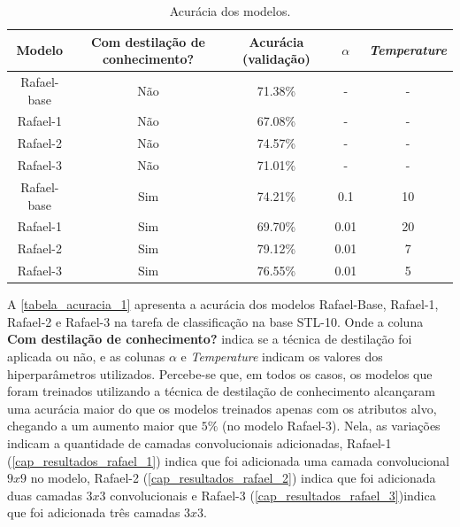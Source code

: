 \begin{center}
\begin{table}[htb]
\centering
\ABNTEXfontereduzida
\caption[Acurácia dos modelos]{Acurácia dos modelos.}
\label{tabela_acuracia_1}
\begin{tabular}{ |c|c|c|c|c| }
	\hline
	\textbf{Modelo} & \textbf{Com destilação de conhecimento?}  & \textbf{Acurácia (validação)}
		   & \textbf{$\alpha$} & \textbf{\textit{Temperature}} \\
	\hline
	Rafael-base 	& 	Não 	& 	71.38\%	& 	- 	& 	-	 \\
	Rafael-1 	& 	Não 	& 	67.08\%	& 	- 	& 	-	 \\
	Rafael-2 	& 	Não 	& 	74.57\%	& 	- 	& 	-	 \\
	Rafael-3 	& 	Não 	& 	71.01\%	& 	- 	& 	-	 \\
	Rafael-base 	& 	Sim 	& 	74.21\%	& 	0.1 	& 	10	 \\
	Rafael-1 	& 	Sim 	& 	69.70\%	& 	0.01 	& 	20	 \\
	Rafael-2 	& 	Sim 	& 	79.12\%	& 	0.01 	& 	7	 \\
	Rafael-3 	& 	Sim 	& 	76.55\%	& 	0.01 	& 	5	 \\
	\hline
\end{tabular}
\end{table}
\end{center}

A \autoref{tabela_acuracia_1} apresenta a acurácia dos modelos Rafael-Base, Rafael-1, Rafael-2 e Rafael-3 na tarefa de
classificação na base STL-10.
Onde a coluna \textbf{Com destilação de conhecimento?} indica se a técnica de destilação foi aplicada
ou não, e as colunas $\alpha$ e \textit{Temperature} indicam os valores dos hiperparâmetros utilizados.
Percebe-se que, em todos os casos, os modelos que foram treinados utilizando a técnica de destilação de conhecimento alcançaram
uma acurácia maior do que os modelos treinados apenas com os atributos alvo, chegando a um aumento maior que $5\%$ (no modelo
Rafael-3).
Nela, as variações indicam a quantidade de camadas convolucionais adicionadas, Rafael-1
(\autoref{cap_resultados_rafael_1}) indica que foi adicionada uma camada convolucional $9x9$ no modelo, Rafael-2
(\autoref{cap_resultados_rafael_2}) indica que foi adicionada duas camadas $3x3$ convolucionais e Rafael-3
(\autoref{cap_resultados_rafael_3})indica que foi adicionada três camadas $3x3$.

